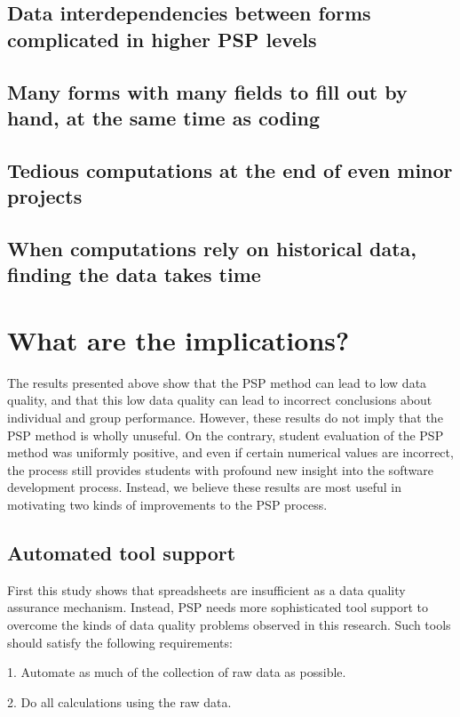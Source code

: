 \subsection{Data interdependencies between forms complicated in higher 
PSP levels}
\subsection{Many forms with many fields to fill out by hand, at the same 
time as coding}
\subsection{Tedious computations at the end of even minor projects}
\subsection{When computations rely on historical data, finding the data 
takes time}

\section{What are the implications?}

The results presented above show that the PSP method can lead to low 
data
quality, and that this low data quality can lead to incorrect 
conclusions
about individual and group performance.  However, these results do not 
imply
that the PSP method is wholly unuseful.  On the contrary, student 
evaluation
of the PSP method was uniformly positive, and even if certain numerical
values are incorrect, the process still provides students with profound 
new
insight into the software development process.  Instead, we believe 
these
results are most useful in motivating two kinds of improvements to the 
PSP
process.

\subsection{Automated tool support}

First this study shows that spreadsheets are insufficient as a data 
quality
assurance mechanism.  Instead, PSP needs more sophisticated tool support 
to
overcome the kinds of data quality problems observed in this research.
Such tools should satisfy the following requirements:

1. Automate as much of the collection of raw data as possible.

2. Do all calculations using the raw data.


